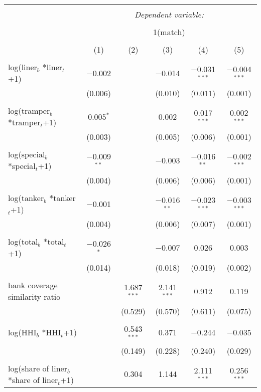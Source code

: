 
\begin{tabular}{@{\extracolsep{5pt}}lccccc} 
\\[-1.8ex]\hline 
\hline \\[-1.8ex] 
 & \multicolumn{5}{c}{\textit{Dependent variable:}} \\ 
\cline{2-6} 
\\[-1.8ex] & \multicolumn{5}{c}{1(match)} \\ 
\\[-1.8ex] & (1) & (2) & (3) & (4) & (5)\\ 
\hline \\[-1.8ex] 
 log(liner$_{b}$ *liner$_{t}$+1) & $-$0.002 &  & $-$0.014 & $-$0.031$^{***}$ & $-$0.004$^{***}$ \\ 
  & (0.006) &  & (0.010) & (0.011) & (0.001) \\ 
  & & & & & \\ 
 log(tramper$_{b}$ *tramper$_{t}$+1) & 0.005$^{*}$ &  & 0.002 & 0.017$^{***}$ & 0.002$^{***}$ \\ 
  & (0.003) &  & (0.005) & (0.006) & (0.001) \\ 
  & & & & & \\ 
 log(special$_{b}$ *special$_{t}$+1) & $-$0.009$^{**}$ &  & $-$0.003 & $-$0.016$^{**}$ & $-$0.002$^{***}$ \\ 
  & (0.004) &  & (0.006) & (0.006) & (0.001) \\ 
  & & & & & \\ 
 log(tanker$_{b}$ *tanker$_{t}$+1) & $-$0.001 &  & $-$0.016$^{**}$ & $-$0.023$^{***}$ & $-$0.003$^{***}$ \\ 
  & (0.004) &  & (0.006) & (0.007) & (0.001) \\ 
  & & & & & \\ 
 log(total$_{b}$ *total$_{t}$+1) & $-$0.026$^{*}$ &  & $-$0.007 & 0.026 & 0.003 \\ 
  & (0.014) &  & (0.018) & (0.019) & (0.002) \\ 
  & & & & & \\ 
 bank coverage similarity ratio &  & 1.687$^{***}$ & 2.141$^{***}$ & 0.912 & 0.119 \\ 
  &  & (0.529) & (0.570) & (0.611) & (0.075) \\ 
  & & & & & \\ 
 log(HHI$_{b}$ *HHI$_{t}$+1) &  & 0.543$^{***}$ & 0.371 & $-$0.244 & $-$0.035 \\ 
  &  & (0.149) & (0.228) & (0.240) & (0.029) \\ 
  & & & & & \\ 
 log(share of liner$_{b}$ *share of liner$_{t}$+1) &  & 0.304 & 1.144 & 2.111$^{***}$ & 0.256$^{***}$ \\ 

\end{tabular}
